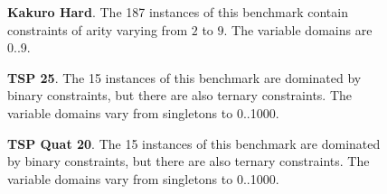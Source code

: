 \begin{figure}
  \begin{minipage}[b][10cm][s]{0.45\textwidth}
    \centering
    \vfill
    \begin{tikzpicture}[scale=0.8]
      
    \end{tikzpicture}
    \vfill
    \caption{\textbf{Kakuro Hard}. The 187 instances
    of this benchmark contain constraints of arity varying
    from $2$ to $9$.
  The variable domains are 0..9.}
    \vspace{\baselineskip}
  \end{minipage}\qquad
\end{figure}

\newpage

\begin{figure}
  \begin{minipage}[b][10cm][s]{0.45\textwidth}
    \centering
    \vfill
    \begin{tikzpicture}[scale=0.8]
      
    \end{tikzpicture}
    \vfill
    \caption{\textbf{TSP 25}.
      The 15 instances of this benchmark are dominated
      by binary constraints, but there are also ternary constraints.
      The variable domains vary from singletons to 0..1000.}
    \vspace{\baselineskip}
  \end{minipage}\qquad
  \begin{minipage}[b][10cm][s]{0.45\textwidth}
    \centering
    \vfill
    \begin{tikzpicture}[scale=0.8]
      
    \end{tikzpicture}
    \vfill
    \caption{\textbf{TSP Quat 20}.
      The 15 instances of this benchmark are dominated
      by binary constraints, but there are also ternary constraints.
      The variable domains vary from singletons to 0..1000.}
    \vspace{\baselineskip}
  \end{minipage}\qquad
\end{figure}

\newpage

